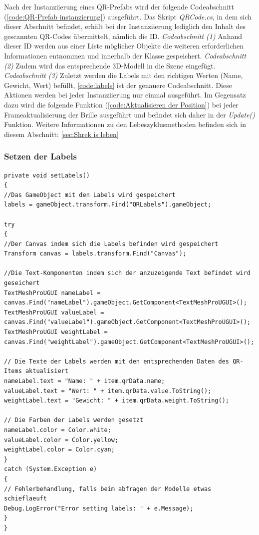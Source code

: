 Nach der Instanziierung eines QR-Prefabs wird der folgende Codeabschnitt (\ref{code:QR-Prefab instanzierung}) ausgeführt. Das Skript \textit{QRCode.cs}, in dem sich dieser Abschnitt befindet, erhält bei der Instanziierung lediglich den Inhalt des gescannten QR-Codes übermittelt, nämlich die ID. \textit{Codeabschnitt (1)} Anhand dieser ID werden aus einer Liste möglicher Objekte die weiteren erforderlichen Informationen entnommen und innerhalb der Klasse gespeichert. \textit{Codeabschnitt (2)} Zudem wird das entsprechende 3D-Modell in die Szene eingefügt. \textit{Codeabschnitt (3)} Zuletzt werden die Labels mit den richtigen Werten (Name, Gewicht, Wert) befüllt, \ref{code:labels} ist der genauere Codeabschnitt. Diese Aktionen werden bei jeder Instanziierung nur einmal ausgeführt. Im Gegensatz dazu wird die folgende Funktion (\ref{code:Aktualisieren der Position}) bei jeder Frameaktualisierung der Brille ausgeführt und befindet sich daher in der \textit{Update()} Funktion. Weitere Informationen zu den Lebeszyklusmethoden befinden sich in diesem Abschnitt: \ref{sec:Shrek is leben}

\subsubsection*{Setzen der Labels}
\begin{lstlisting}[style=csharp, caption={Setzen der Labels}, label=code:labels]
private void setLabels()
{
//Das GameObject mit den Labels wird gespeichert
labels = gameObject.transform.Find("QRLabels").gameObject;

try
{
//Der Canvas indem sich die Labels befinden wird gespeichert
Transform canvas = labels.transform.Find("Canvas");

//Die Text-Komponenten indem sich der anzuzeigende Text befindet wird geseichert
TextMeshProUGUI nameLabel = canvas.Find("nameLabel").gameObject.GetComponent<TextMeshProUGUI>();
TextMeshProUGUI valueLabel = canvas.Find("valueLabel").gameObject.GetComponent<TextMeshProUGUI>();
TextMeshProUGUI weightLabel = canvas.Find("weightLabel").gameObject.GetComponent<TextMeshProUGUI>();

// Die Texte der Labels werden mit den entsprechenden Daten des QR-Items aktualisiert
nameLabel.text = "Name: " + item.qrData.name;
valueLabel.text = "Wert: " + item.qrData.value.ToString();
weightLabel.text = "Gewicht: " + item.qrData.weight.ToString();

// Die Farben der Labels werden gesetzt
nameLabel.color = Color.white;
valueLabel.color = Color.yellow;
weightLabel.color = Color.cyan;
}
catch (System.Exception e)
{
// Fehlerbehandlung, falls beim abfragen der Modelle etwas schieflaeuft
Debug.LogError("Error setting labels: " + e.Message);
}
}
\end{lstlisting}

